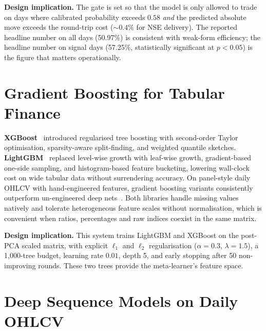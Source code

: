 \textbf{Design implication.} The gate is set so that the model is only allowed to trade on days where calibrated probability exceeds $0.58$ \emph{and} the predicted absolute move exceeds the round-trip cost ($\sim 0.4\%$ for NSE delivery). The reported headline number on all days (50.97\%) is consistent with weak-form efficiency; the headline number on signal days (57.25\%, statistically significant at $p<0.05$) is the figure that matters operationally.

\section{Gradient Boosting for Tabular Finance}

\textbf{XGBoost}~\cite{chen2016xgboost} introduced regularised tree boosting with second-order Taylor optimisation, sparsity-aware split-finding, and weighted quantile sketches. \textbf{LightGBM}~\cite{ke2017lightgbm} replaced level-wise growth with leaf-wise growth, gradient-based one-side sampling, and histogram-based feature bucketing, lowering wall-clock cost on wide tabular data without surrendering accuracy. On panel-style daily OHLCV with hand-engineered features, gradient boosting variants consistently outperform un-engineered deep nets~\cite{shwartz2022tabular,grinsztajn2022treesvsdl}. Both libraries handle missing values natively and tolerate heterogeneous feature scales without normalisation, which is convenient when ratios, percentages and raw indices coexist in the same matrix.

\textbf{Design implication.} This system trains LightGBM and XGBoost on the post-PCA scaled matrix, with explicit $\ell_1$ and $\ell_2$ regularisation ($\alpha=0.3$, $\lambda=1.5$), a 1{,}000-tree budget, learning rate $0.01$, depth 5, and early stopping after 50 non-improving rounds. These two trees provide the meta-learner's feature space.

\section{Deep Sequence Models on Daily OHLCV}

